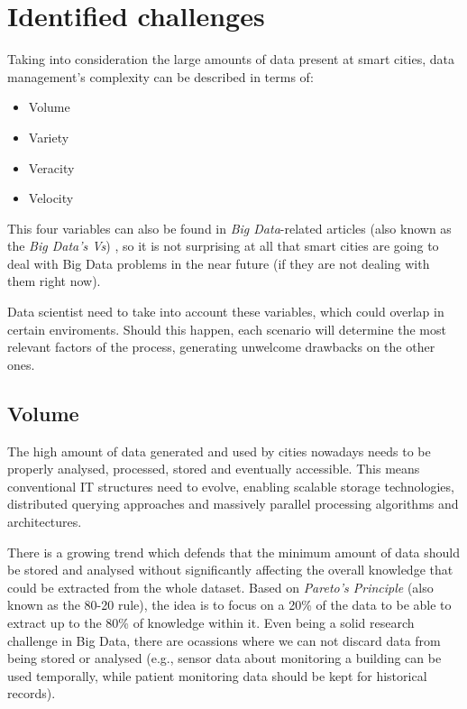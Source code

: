 \section{Identified challenges}

Taking into consideration the large amounts of data present at smart cities, data management's complexity can be described in terms of:
\begin{itemize}
	\item Volume
	\item Variety
	\item Veracity
	\item Velocity
\end{itemize}

This four variables can also be found in \textit{Big Data}-related articles (also known as the \textit{Big Data's Vs}) \cite{zikopoulos2011understanding,russom2011big}, so it is not surprising at all that smart cities are going to deal with Big Data problems in the near future (if they are not dealing with them right now).

Data scientist need to take into account these variables, which could overlap in certain enviroments. Should this happen, each scenario will determine the most relevant factors of the process, generating unwelcome drawbacks on the other ones.

\subsection{Volume}

The high amount of data generated and used by cities nowadays needs to be properly analysed, processed, stored and eventually accessible. This means conventional IT structures need to evolve, enabling scalable storage technologies, distributed querying approaches and massively parallel processing algorithms and architectures.

There is a growing trend which defends that the minimum amount of data should be stored and analysed without significantly affecting the overall knowledge that could be extracted from the whole dataset. Based on \textit{Pareto's Principle} (also known as the 80-20 rule), the idea is to focus on a 20\% of the data to be able to extract up to the 80\% of knowledge within it. Even being a solid research challenge in Big Data, there are ocassions where we can not discard data from being stored or analysed (e.g., sensor data about monitoring a building can be used temporally, while patient monitoring data should be kept for historical records).


